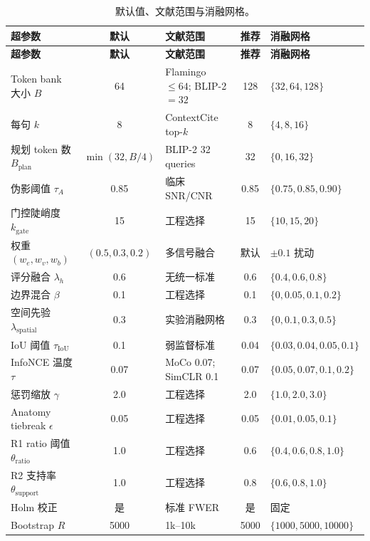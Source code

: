\documentclass[11pt,a4paper]{article}
\theoremstyle{definition}
\begin{document}
\begin{longtable}{p{3.6cm}cp{3cm}cp{3.6cm}}
\caption{默认值、文献范围与消融网格。}\label{tab:hyper}\\
\toprule
\textbf{超参数} & \textbf{默认} & \textbf{文献范围} & \textbf{推荐} & \textbf{消融网格} \\
\midrule\endfirsthead
\toprule
\textbf{超参数} & \textbf{默认} & \textbf{文献范围} & \textbf{推荐} & \textbf{消融网格} \\
\midrule\endhead

Token bank 大小 $B$ & 64 & Flamingo $\leq 64$; BLIP-2 $=32$ & 128 & $\{32,64,128\}$ \\
每句 $k$ & 8 & ContextCite top-$k$ & 8 & $\{4,8,16\}$ \\
规划 token 数 $B_{\mathrm{plan}}$ & $\min(32,B/4)$ & BLIP-2 32 queries & 32 & $\{0,16,32\}$ \\
伪影阈值 $\tau_A$ & 0.85 & 临床 SNR/CNR & 0.85 & $\{0.75,0.85,0.90\}$ \\
门控陡峭度 $k_{\mathrm{gate}}$ & 15 & 工程选择 & 15 & $\{10,15,20\}$ \\
权重 $(w_e,w_v,w_b)$ & $(0.5,0.3,0.2)$ & 多信号融合 & 默认 & $\pm 0.1$ 扰动 \\
评分融合 $\lambda_h$ & 0.6 & 无统一标准 & 0.6 & $\{0.4,0.6,0.8\}$ \\
边界混合 $\beta$ & 0.1 & 工程选择 & 0.1 & $\{0,0.05,0.1,0.2\}$ \\
空间先验 $\lambda_{\mathrm{spatial}}$ & 0.3 & 实验消融网格 & 0.3 & $\{0,0.1,0.3,0.5\}$ \\
IoU 阈值 $\tau_{\mathrm{IoU}}$ & 0.1 & 弱监督标准 & 0.04 & $\{0.03,0.04,0.05,0.1\}$ \\
InfoNCE 温度 $\tau$ & 0.07 & MoCo 0.07; SimCLR 0.1 & 0.07 & $\{0.05,0.07,0.1,0.2\}$ \\
惩罚缩放 $\gamma$ & 2.0 & 工程选择 & 2.0 & $\{1.0,2.0,3.0\}$ \\
Anatomy tiebreak $\epsilon$ & 0.05 & 工程选择 & 0.05 & $\{0.01,0.05,0.1\}$ \\
R1 ratio 阈值 $\theta_{\mathrm{ratio}}$ & 1.0 & 工程选择 & 0.6 & $\{0.4,0.6,0.8,1.0\}$ \\
R2 支持率 $\theta_{\mathrm{support}}$ & 1.0 & 工程选择 & 0.8 & $\{0.6,0.8,1.0\}$ \\
Holm 校正 & 是 & 标准 FWER & 是 & 固定 \\
Bootstrap $R$ & 5000 & 1k--10k & 5000 & $\{1000,5000,10000\}$ \\
\bottomrule
\end{longtable}
\end{document}
